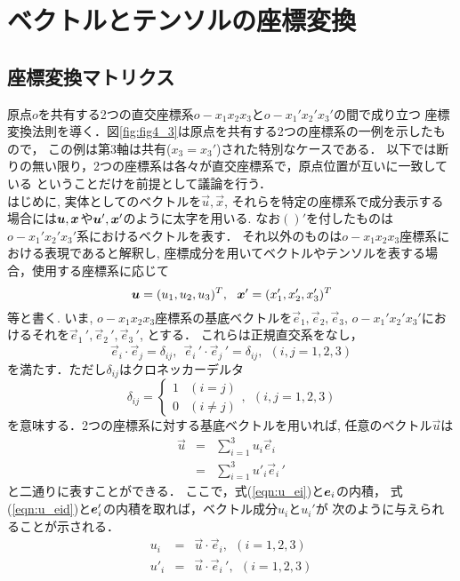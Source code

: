 \documentclass[10pt,a4j]{jbook}
\begin{document}
\section{ベクトルとテンソルの座標変換}
\subsection{座標変換マトリクス}
原点$o$を共有する2つの直交座標系$o-x_1x_2x_3$と$o-x_1'x_2'x_3'$の間で成り立つ
座標変換法則を導く．図\ref{fig:fig4_3}は原点を共有する2つの座標系の一例を示したもので，
この例は第3軸は共有($x_3=x_3'$)された特別なケースである．
以下では断りの無い限り，2つの座標系は各々が直交座標系で，原点位置が互いに一致している
ということだけを前提として議論を行う．\\
はじめに, 実体としてのベクトルを$\vec{u},\vec{x}$, それらを特定の座標系で成分表示する
場合には$\mbox{\boldmath $u$},\mbox{\boldmath $x$}$や$\mbox{\boldmath $u$}',\mbox{\boldmath $x$}'$のように太字を用いる. 
なお$()'$を付したものは$o-x_1'x_2'x_3'$系におけるベクトルを表す．
それ以外のものは$o-x_1x_2x_3$座標系における表現であると解釈し, 
座標成分を用いてベクトルやテンソルを表する場合，使用する座標系に応じて
\[
	\fat{u}=(u_1, u_2, u_3)^T, \ \ \fat{x}'=(x_1', x_2', x_3')^T
\]
等と書く.
いま, $o-x_1x_2x_3$座標系の基底ベクトルを$\vec{e}_1, \vec{e}_2, \vec{e}_3$, 
$o-x_1'x_2'x_3'$におけるそれを$\vec{e}_1\,', \vec{e}_2\,', \vec{e}_3 \,'$, 
とする． これらは正規直交系をなし，
\begin{equation}
	\vec{e}_i\cdot \vec{e}_j=\delta_{ij}, \ \ 
	\vec{e}_i\,' \cdot \vec{e}_j\,'=\delta_{ij}, \ \ (i,j=1,2,3)
	\label{eqn:ortho_norm}
\end{equation}
を満たす．ただし$\delta_{ij}$はクロネッカーデルタ
\begin{equation}
	\delta _{ij}=\left\{
	\begin{array}{cc}
		1 & (i=j) \\
		0 & (i\neq j)
	\end{array}
	\right. , \ \ (i,j=1,2,3)
	\label{eqn:dij}
\end{equation}
を意味する．2つの座標系に対する基底ベクトルを用いれば, 任意のベクトル$\vec{u}$は
\begin{eqnarray}
	\vec{u} &=& \sum_{i=1}^3 u_i\vec{e}_i 
	\label{eqn:u_ei}
	\\
	&=& \sum_{i=1}^3 u'_i\vec{e}_i\,' 
	\label{eqn:u_eid}
\end{eqnarray}
と二通りに表すことができる． ここで，式(\ref{eqn:u_ei})と$\mbox{\boldmath $e$}_i$の内積，
式(\ref{eqn:u_eid})と$\mbox{\boldmath $e$}'_i$の内積を取れば，ベクトル成分$u_i$と$u_i'$が
次のように与えられることが示される．
\begin{eqnarray}
	u_i &=& \vec{u}\cdot \vec{e}_i \label{eqn:ui} , \ \ (i=1,2,3) \\
	u'_i&=& \vec{u}\cdot \vec{e}_i\,' \label{eqn:uid}, \ \ (i=1,2,3)
\end{eqnarray}
\end{document}
